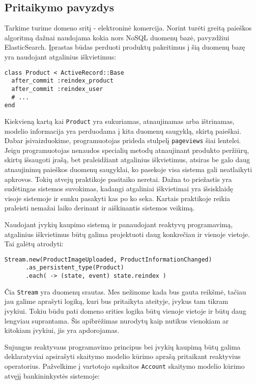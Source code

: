 \subsection{Pritaikymo pavyzdys}

Tarkime turime domeno sritį - elektroninė komercija. Norint turėti greitą paieškos algoritmą dažnai naudojama kokia nors NoSQL duomenų bazė, pavyzdžiui ElasticSearch. Įprastas būdas perduoti produktų pakeitimus į šią duomenų bazę yra naudojant atgalinius iškvietimus:

\begin{lstlisting}[]
class Product < ActiveRecord::Base
  after_commit :reindex_product
  after_commit :reindex_user
  # ...
end
\end{lstlisting}

Kiekvieną kartą kai \lstinline|Product| yra sukuriamas, atnaujinamas arba ištrinamas, modelio informacija yra perduodama į kita duomenų saugyklą, skirtą paieškai. Dabar įsivaizduokime, programuotojas prideda stulpelį \lstinline|pageviews| šiai lentelei. Jeigu programuotojas nenaudos specialių metodų atnaujinant produkto peržiūrų, skirtų išsaugoti įrašą, bet praleidžiant atgalinius iškvietimus, atsiras be galo daug atnaujinimų paieškos duomenų saugyklai, ko pasekoje visa sistema gali neatlaikyti apkrovos. Tokių atvejų praktikoje pasitaiko neretai. Dažna to priežastis yra sudėtingas sistemos suvokimas, kadangi atgaliniai iškvietimai yra išsisklaidę visoje sistemoje ir sunku pasakyti kas po ko seka. Kartais praktikoje reikia praleisti nemažai laiko derinant ir aiškinantis sistemos veikimą.

Naudojant įvykių kaupimo sistemą ir panaudojant reaktyvų programavimą, atgalinius iškvietimus būtų galima projektuoti daug konkrečiau ir vienoje vietoje. Tai galėtų atrodyti:

\begin{lstlisting}[]
  Stream.new(ProductImageUploaded, ProductInformationChanged)
      .as_persistent_type(Product)
      .each( -> (state, event) state.reindex )
\end{lstlisting}

Čia \lstinline|Stream| yra duomenų srautas. Mes nežinome kada bus gauta reikšmė, tačiau jau galime aprašyti logiką, kuri bus pritaikyta ateityje, įvykus tam tikram įvykiui. Tokiu būdu pati domeno srities logika būtų vienoje vietoje ir būtų daug lengviau suprantama. Šis apibrėžimas nurodytų kaip nutikus vienokiam ar kitokiam įvykiui, jis yra apdorojamas.

Sujungus reaktyvaus programavimo principus bei įvykių kaupimą būtų galima deklaratyviai apsirašyti skaitymo modelio kūrimo aprašą pritaikant reaktyvius operatorius. Pažvelkime į vartotojo sąskaitos \lstinline|Account| skaitymo modelio kūrimo atvęjį bankininkystės sistemoje:

